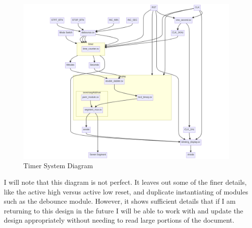 \begin{figure}[H]
    \centering
    \includegraphics[width = \textwidth]{Images/SystemBlockDiagram.png}
    \caption{Timer System Diagram}
    \label{fig:Timer Diagram}
\end{figure}
I will note that this diagram is not perfect. It leaves out some of the finer details, like the active high versus active low reset, and duplicate instantiating of modules such as the debounce module. However, it shows sufficient details that if I am returning to this design in the future I will be able to work with and update the design appropriately without needing to read large portions of the document. 